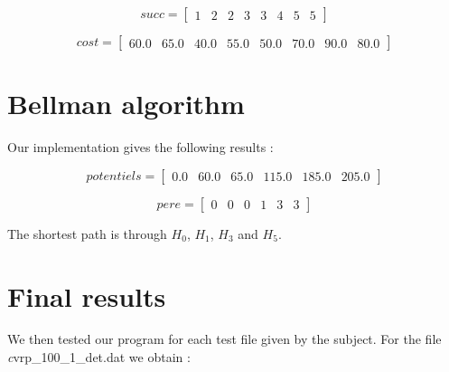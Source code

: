 \begin{displaymath}
succ = \begin{bmatrix}
1 & 2 & 2 & 3 & 3 & 4 & 5 & 5
\end{bmatrix}
\end{displaymath}

\begin{displaymath}
cost = \begin{bmatrix}
60.0 & 65.0 & 40.0 & 55.0 & 50.0 & 70.0 & 90.0 & 80.0
\end{bmatrix}
\end{displaymath}

\section{Bellman algorithm}

Our implementation gives the following results :

\begin{displaymath}
potentiels = \begin{bmatrix}
0.0 & 60.0 & 65.0 & 115.0 & 185.0 & 205.0
\end{bmatrix}
\end{displaymath}

\begin{displaymath}
pere = \begin{bmatrix}
0 & 0 & 0 & 1 & 3 & 3
\end{bmatrix}
\end{displaymath}

The shortest path is through $H_0$, $H_1$, $H_3$ and $H_5$.

\section{Final results}

We then tested our program for each test file given by the subject. For the file {\textit cvrp\_100\_1\_det.dat} we obtain :

